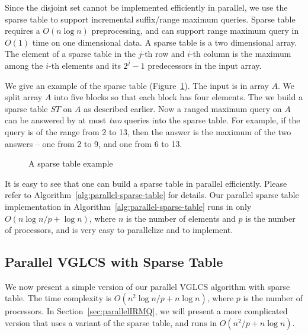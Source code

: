 Since the disjoint set cannot be implemented efficiently in parallel,
we use the sparse table to support incremental suffix/range maximum
queries.  Sparse table~\cite{Berkman1993RecursiveSP} requires a $O(n
\log n)$ preprocessing, and can support range maximum query in $O(1)$
time on one dimensional data.  A sparse table is a two dimensional
array.  The element of a sparse table in the $j$-th row and $i$-th
column is the maximum among the $i$-th elements and its $2^j - 1$
predecessors in the input array.

We give an example of the sparse table
(Figure~\ref{fig:interval-decomposition}).  The input is in array
$A$. We split array $A$ into five blocks so that each block has four
elements.  The we build a sparse table $ST$ on $A$ as described
earlier.  Now a ranged maximum query on $A$ can be answered by at most
{\em two} queries into the sparse table.  For example, if the query is
of the range from 2 to 13, then the answer is the maximum of the two
answers -- one from 2 to 9, and one from 6 to 13.

\begin{figure}[!thb]
  \centering {} 
  \caption{A sparse table example}
  \label{fig:interval-decomposition}
\end{figure}

It is easy to see that one can build a sparse table in parallel
efficiently.  Please refer to
Algorithm~\ref{alg:parallel-sparse-table} for details.  Our parallel
sparse table implementation in
Algorithm~\ref{alg:parallel-sparse-table} runs in only $O(n \log n / p
+ \log n)$, where $n$ is the number of elements and $p$ is the number
of processors, and is very easy to parallelize and to implement.



\subsection{Parallel VGLCS with Sparse Table}

We now present a simple version of our parallel VGLCS algorithm with
sparse table.  The time complexity is $O(n^2 \log n / p + n \log n)$,
where $p$ is the number of processors.  In
Section~\ref{sec:parallelIRMQ}, we will present a more complicated
version that uses a variant of the sparse table, and runs in $O(n^2 /
p + n \log n)$.

